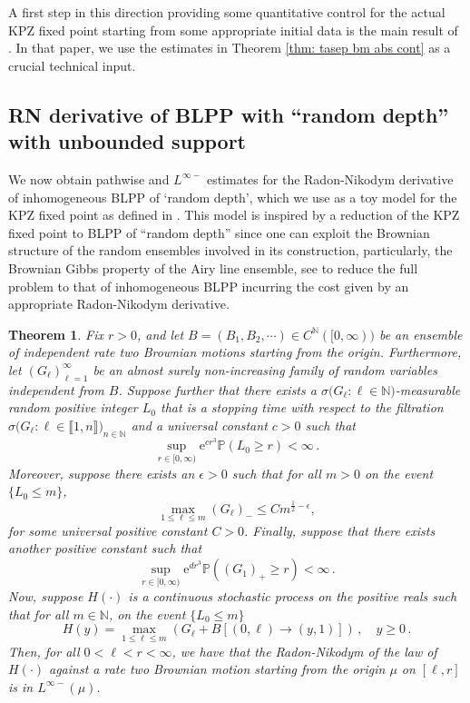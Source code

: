 \documentclass[11pt, reqno]{amsart}
\numberwithin{equation}{section}
\newcounter{dummy} \numberwithin{dummy}{section}
\newtheorem{theorem}[dummy]{Theorem}
\newcommand{\N}{\ensuremath{\mathbb{N}}}
\newcommand{\PP}{\ensuremath{\mathbb{P}}}
\begin{document}
A first step in this direction providing some quantitative control for the actual KPZ fixed point starting from some appropriate initial data is the main result of \cite{tassopoulos2025quantitativebrownianregularitykpz}. In that paper, we use the estimates in Theorem \ref{thm: tasep bm abs cont} as a crucial technical input.

\subsection{RN derivative of BLPP with ``random depth'' with unbounded support}\label{subsec: BLPP rand depth RN}
We now obtain pathwise and $L^{\infty-}$ estimates for the Radon-Nikodym derivative of inhomogeneous BLPP of `random depth', which we use as a toy model for the KPZ fixed point as defined in \cite{Sarkar2021Brownian}. This model is inspired by a reduction of the KPZ fixed point to BLPP of ``random depth'' since one can exploit the Brownian structure of the random ensembles involved in its construction, particularly, the Brownian Gibbs property of the Airy line ensemble, see \cite{Corwin2014Brownian} to reduce the full problem to that of inhomogeneous BLPP incurring the cost given by an appropriate Radon-Nikodym derivative.

\begin{theorem}\label{thm: KPZ rn}
Fix $r>0$, and let $B = (B_1, B_2, \cdots)\in C^{\N}([0,\infty))$ be an ensemble of independent rate two Brownian motions starting from the origin. Furthermore, let $(G_\ell)_{\ell =1}^\infty$ be an almost surely non-increasing family of random variables independent from $B$. Suppose further that there exists a $\sigma\big(G_\ell: \ell\in \N\big)$-measurable random positive integer $L_0$ that is a stopping time with respect to the filtration  $\sigma\big(G_\ell: \ell\in \llbracket 1, n\rrbracket \big)_{n\in \N}$  and a universal constant $c>0$ such that 
\[
\displaystyle\sup_{r\in [0,\infty)}\mathrm{e}^{cr^3}\PP(L_0\ge r)<\infty\,.
\]
Moreover, suppose there exists an $\epsilon> 0$ such that for all $m>0$ on the event $\{L_0\le m\}$,
\begin{equation*}
\displaystyle\max_{1\le \ell\le m}(G_{\ell})_- \le Cm^{\frac{1}{2}-\epsilon},
\end{equation*}
for some universal positive constant $C>0$. Finally, suppose that
there exists another positive constant such that 
\begin{equation}\label{eq: geod conc}
\displaystyle\sup_{r\in [0,\infty)}\mathrm{e}^{dr^3}\PP((G_1)_+\ge r)<\infty\,.
\end{equation}
Now, suppose $H(\cdot)$ is a continuous stochastic process on the positive reals such that for all $m\in \N$, on the event $\{L_0\le m\}$
\[
H(y) = \displaystyle\max_{1\leq \ell\leq m}(G_\ell+B[(0,\ell)\to(y,1)]) \,,\quad y\ge 0\,.
 \]
Then, for all $0<\ell<r<\infty$, we have that the Radon-Nikodym 
     of the law of $H(\cdot)$ against a rate two Brownian motion starting from the origin $\mu$ on $[\ell,r]$ is in $L^{\infty-}(\mu)$.
\end{theorem}
\end{document}
